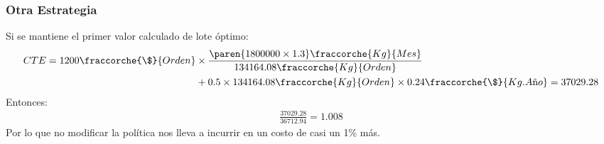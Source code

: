 \begin{homeworkProblem}
\subsubsection{Otra Estrategia}
Si se mantiene el primer valor calculado de lote óptimo:
\begin{align*}
    CTE = 1200\fraccorche{\$}{Orden}&\times \frac{\paren{1800000\times 1.3}\fraccorche{Kg}{Mes}}{134164.08\fraccorche{Kg}{Orden}} \\ &+ 0.5\times 134164.08\fraccorche{Kg}{Orden}\times 0.24\fraccorche{\$}{Kg.A\text{ñ}o}=37029.28
\end{align*}
Entonces:
\begin{align*}
    \frac{37029.28}{36712.94}=1.008
\end{align*}
Por lo que no modificar la política nos lleva a incurrir en un costo de casi un 1\% más.
\end{homeworkProblem}